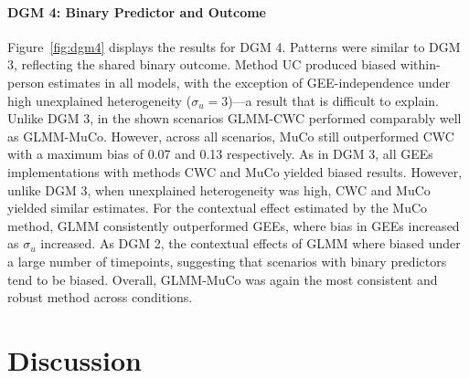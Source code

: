 \documentclass[stu]{apa7}
\begin{document}
\paragraph{DGM 4: Binary Predictor and Outcome}

Figure~\ref{fig:dgm4} displays the results for DGM 4. Patterns were similar to DGM 3, reflecting the shared binary outcome. Method UC produced biased within-person estimates in all models, with the exception of GEE-independence under high unexplained heterogeneity (\(\sigma_u = 3\))—a result that is difficult to explain. Unlike DGM 3,  in the shown scenarios GLMM-CWC performed comparably well as GLMM-MuCo. However, across all scenarios, MuCo still outperformed CWC with a maximum bias of 0.07 and 0.13 respectively. As in DGM 3, all GEEs implementations with methods CWC and MuCo yielded biased results. However, unlike DGM 3, when unexplained heterogeneity was high, CWC and MuCo yielded similar estimates. For the contextual effect estimated by the MuCo method, GLMM consistently outperformed GEEs, where bias in GEEs increased as \(\sigma_u\) increased. As DGM 2, the contextual effects of GLMM where biased under a large number of timepoints, suggesting that scenarios with binary predictors tend to be biased. Overall, GLMM-MuCo was again the most consistent and robust method across conditions.



\newpage



\newpage
\section{Discussion}

\end{document}
